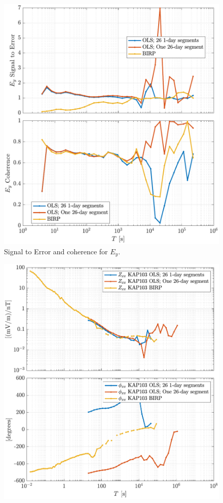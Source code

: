 \documentclass{article}
\begin{document}
\begin{figure}[h!]
\centering
\includegraphics[width=\textwidth]{figures/KAP103/SN_compare-E_y.pdf}
\caption{Signal to Error and coherence for $E_y$.}
\label{fig:universe}
\end{figure}

\clearpage

\begin{figure}[h!]
\centering
\includegraphics[width=\textwidth]{figures/KAP103/transferfnZ_compare-Z_xx_Magnitude_Phase.pdf}
\caption{}
\end{figure}
\end{document}
